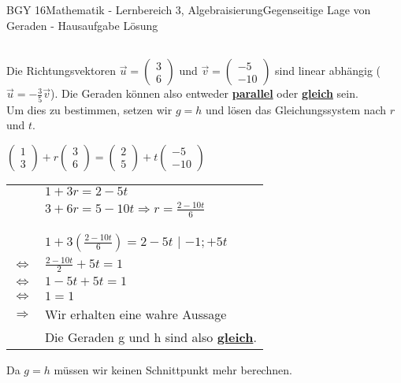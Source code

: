 \documentclass[oneside,openany,headings=optiontotoc,11pt,numbers=noenddot]{scrreprt}
\begin{document}
\begin{worksheet}{BGY 16}{Mathematik - Lernbereich 3, Algebraisierung}{Gegenseitige Lage von Geraden - Hausaufgabe Lösung}
\begin{framed}
\begin{tabularx}{\textwidth}{XX}
			\end{tabularx}
			Die Richtungsvektoren \(\vec{u} = \left(\begin{array}{c}3\\6\end{array}\right)\) und \(\vec{v} = \left(\begin{array}{c}-5\\-10\end{array}\right)\) sind \color{blue}linear abhängig \normalcolor(\(\vec{u} = -\frac{3}{5}\vec{v}\)). Die Geraden können also entweder \textbf{\underline{parallel}} oder \textbf{\underline{gleich}} sein.\\
			Um dies zu bestimmen, setzen wir \(g=h\) und lösen das Gleichungssystem nach \(r\) und \(t\).\\
			\par\noindent
			\par\noindent
			\(\left(\begin{array}{c}1\\3\end{array}\right) + r\left(\begin{array}{c}3\\6\end{array}\right) = \left(\begin{array}{c}2\\5\end{array}\right) + t\left(\begin{array}{c}-5\\-10\end{array}\right)\)
			\begin{center}
				\begin{tabular}{cl}
					&\(1 + 3r = 2 - 5t\)\\
					&\(3 + 6r = 5 - 10t \Rightarrow r = \frac{2 - 10t}{6}\)\\
					\\
					\hline\\
					\par
					&\(1 + 3(\frac{2 - 10t}{6}) = 2 -5t\) | \(-1; +5t\)\\
					\(\Leftrightarrow\) & \(\frac{2 - 10t}{2} + 5t = 1\)\\
					\(\Leftrightarrow\) & \(1 - 5t + 5t = 1\)\\
					\(\Leftrightarrow\) & \(1 = 1\)\\
					\(\Rightarrow\) & Wir erhalten eine wahre Aussage\\
					& Die Geraden g und h sind also \textbf{\underline{gleich}}.
				\end{tabular}				
			\end{center}
			Da \(g=h\) müssen wir keinen Schnittpunkt mehr berechnen.		
		\end{framed}
		

\end{worksheet}
\end{document}
